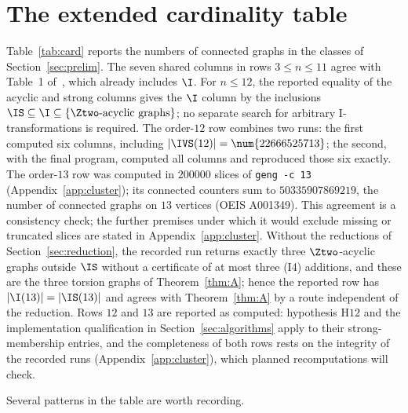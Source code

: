 \section{The extended cardinality table}\label{sec:table}

Table~\ref{tab:card} reports the numbers of connected graphs in the classes of Section~\ref{sec:prelim}. The seven shared columns in rows $3\le n\le11$ agree with Table~1 of~\cite{DEFH2023}, which already includes $\I$. For $n\le12$, the reported equality of the acyclic and strong columns gives the $\I$ column by the inclusions $\IS\subseteq\I\subseteq\{\Ztwo\text{-acyclic graphs}\}$; no separate search for arbitrary I-transformations is required. The order-$12$ row combines two runs: the first computed six columns, including $|\IVS(12)|=\num{22666525713}$; the second, with the final program, computed all columns and reproduced those six exactly. The order-$13$ row was computed in $\num{200000}$ slices of \texttt{geng -c 13} (Appendix~\ref{app:cluster}); its connected counters sum to $\num{50335907869219}$, the number of connected graphs on $13$ vertices (OEIS A001349). This agreement is a consistency check; the further premises under which it would exclude missing or truncated slices are stated in Appendix~\ref{app:cluster}. Without the reductions of Section~\ref{sec:reduction}, the recorded run returns exactly three $\Ztwo$-acyclic graphs outside $\IS$ without a certificate of at most three (I4) additions, and these are the three torsion graphs of Theorem~\ref{thm:A}; hence the reported row has $|\I(13)|=|\IS(13)|$ and agrees with Theorem~\ref{thm:A} by a route independent of the reduction. Rows $12$ and $13$ are reported as computed: hypothesis $\mathrm{H12}$ and the implementation qualification in Section~\ref{sec:algorithms} apply to their strong-membership entries, and the completeness of both rows rests on the integrity of the recorded runs (Appendix~\ref{app:cluster}), which planned recomputations will check.

Several patterns in the table are worth recording.

